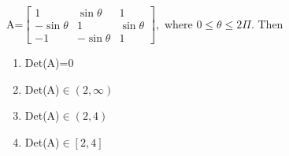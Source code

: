 \begin{enumerate}[label=\arabic*.,ref=\thesubsection.\theenumi]
A=$\begin{bmatrix}
1&\sin\theta&1 \\ -\sin\theta&1&\sin\theta \\ -1&-\sin\theta&1
\end{bmatrix},$ 
where $0\leq \theta \leq 2\Pi.$ Then
\begin{enumerate}
\item Det(A)=0
\item Det(A)$\in(2,\infty)$
\item Det(A)$\in (2,4)$
\item Det(A)$\in [2,4]$
\end{enumerate}
\end{enumerate}
    
